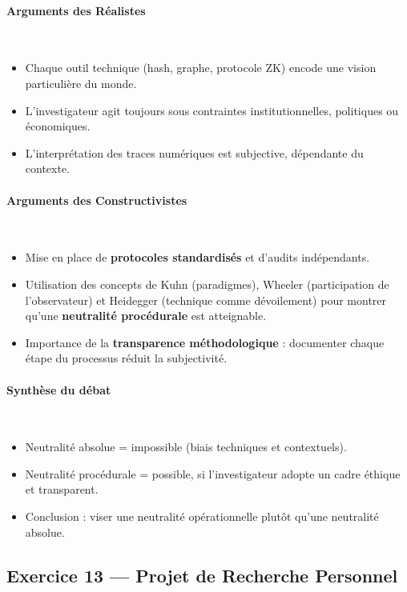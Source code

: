 \documentclass[11pt]{article}
\begin{document}
\paragraph{Arguments des Réalistes}\\
\begin{itemize}
  \item Chaque outil technique (hash, graphe, protocole ZK) encode une vision particulière du monde.
  \item L’investigateur agit toujours sous contraintes institutionnelles, politiques ou économiques.
  \item L’interprétation des traces numériques est subjective, dépendante du contexte.
\end{itemize}

\paragraph{Arguments des Constructivistes}\\
\begin{itemize}
  \item Mise en place de \textbf{protocoles standardisés} et d’audits indépendants.
  \item Utilisation des concepts de Kuhn (paradigmes), Wheeler (participation de l’observateur) et Heidegger (technique comme dévoilement) pour montrer qu’une \textbf{neutralité procédurale} est atteignable.
  \item Importance de la \textbf{transparence méthodologique} : documenter chaque étape du processus réduit la subjectivité.
\end{itemize}

\paragraph{Synthèse du débat}\\
\begin{itemize}
  \item Neutralité absolue = impossible (biais techniques et contextuels).
  \item Neutralité procédurale = possible, si l’investigateur adopte un cadre éthique et transparent.
  \item Conclusion : viser une \og neutralité opérationnelle \fg plutôt qu’une neutralité absolue.
\end{itemize}

\subsection{Exercice 13 — Projet de Recherche Personnel}
\end{document}
